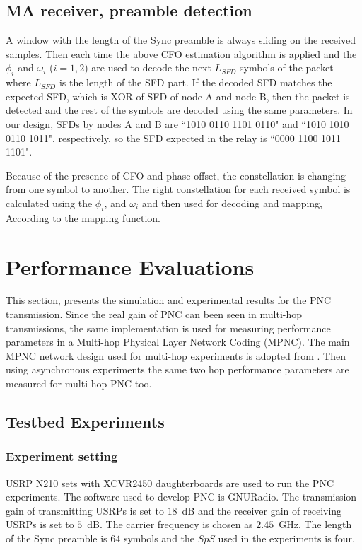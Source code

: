 \subsection{MA receiver, preamble detection}
A window with the length of the Sync preamble is always sliding on the received samples. Then each time the above CFO estimation algorithm is applied and the $\phi_i$ and $\omega_i$ ($i=1,2$) are used to decode the next $L_{SFD}$ symbols of the packet where $L_{SFD}$  is the length of the SFD part. If the decoded SFD matches the expected SFD, which is XOR of SFD of node A and node B, %
 then the packet is detected and the rest of the symbols are decoded using the same parameters. In our design, SFDs by nodes A  and B are ``1010 0110 1101 0110" and ``1010 1010 0110 1011", respectively, so the SFD expected in the relay is ``0000 1100 1011 1101". 
 
Because of the presence of CFO and phase offset, the constellation is changing from one symbol to another. The right constellation for each received symbol is calculated using the $\phi_i$, and $\omega_i$ and then used for decoding and mapping, According to the mapping function. %

\section{Performance Evaluations}
This section, presents the simulation and experimental results for the PNC transmission. Since the real gain of PNC can been seen in multi-hop transmissions, the same implementation is used for measuring performance parameters in a Multi-hop Physical Layer Network Coding (MPNC). The main MPNC network design used for multi-hop experiments is adopted from \cite{zhang2017bi}. Then using asynchronous experiments the same two hop performance parameters are measured for multi-hop PNC too. 

\subsection{Testbed Experiments}

\subsubsection{Experiment setting}
USRP N210 sets with XCVR2450 daughterboards are used to run the PNC experiments. The software used to develop PNC is GNURadio. The transmission gain of transmitting USRPs is set to $18$~dB and the receiver gain of receiving USRPs is set  to $5$~dB. %
The carrier frequency is chosen as $2.45$~GHz. The length of the Sync preamble is $64$ symbols and the $SpS$ used in the experiments is four. 


